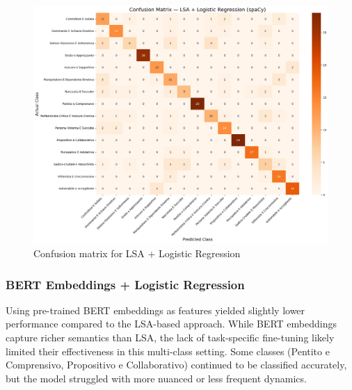\documentclass[conference]{IEEEtran}
\begin{document}
\begin{figure}[H]
  \centering
  \includegraphics[width=\columnwidth]{figures/lsa_logreg_confusion_matrix.png}
  \caption{Confusion matrix for LSA + Logistic Regression}
\end{figure}

\vspace{1em}

\subsubsection{BERT Embeddings + Logistic Regression}
\noindent
Using pre-trained BERT embeddings as features yielded slightly lower performance compared to the LSA-based approach. While BERT embeddings capture richer semantics than LSA, the lack of task-specific fine-tuning likely limited their effectiveness in this multi-class setting. Some classes (Pentito e Comprensivo, Propositivo e Collaborativo) continued to be classified accurately, but the model struggled with more nuanced or less frequent dynamics.
\end{document}
